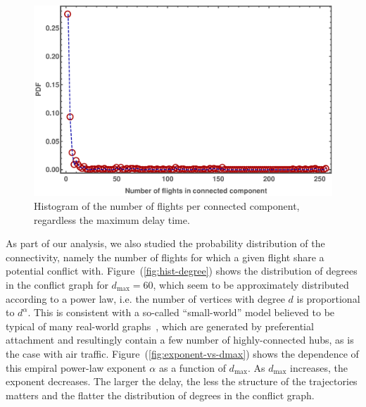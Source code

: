 \begin{figure}[p]
\includegraphics[width=\columnwidth]{pics/instances/analysis_cc.pdf}
\caption[Histogram of connected component sizes]{Histogram of the number of flights per connected component, regardless the maximum delay time.}
\label{fig:hist-CC-sizes}
\end{figure}

As part of our analysis, we also studied the probability
distribution of the connectivity, namely the number of flights
for which a given flight share a potential conflict with. 
Figure~(\ref{fig:hist-degree}) shows
the distribution of degrees in the conflict graph for $d_{\max}=60$,
which seem to be approximately distributed according to a power law, i.e. 
the number of vertices with degree $d$ is proportional to $d^{\alpha}$.
This is consistent with a so-called ``small-world'' model believed to be typical of many real-world graphs~\cite{barabasi:99}, which are generated by preferential attachment and resultingly contain a few number of highly-connected hubs, as is the case with air traffic.
Figure~(\ref{fig:exponent-vs-dmax}) shows the dependence of this empiral power-law exponent $\alpha$ as a function of $d_{\max}$.
As $d_{\max}$ increases, the exponent decreases.
The larger the delay, the less the structure of the trajectories matters and the flatter the distribution of degrees in the conflict graph.

